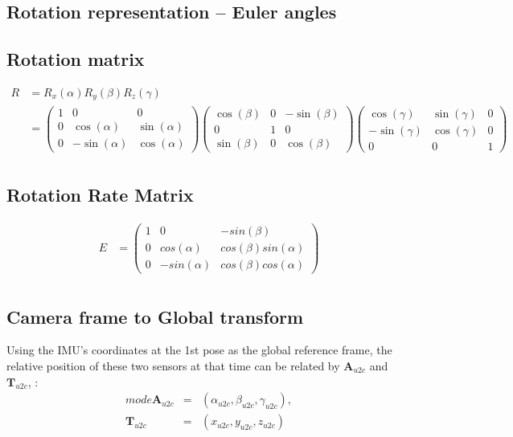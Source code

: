 \documentclass[12pt]{article}   %
\begin{document}
\newpage 
\begin{appendices}
	\section{Rotation representation -- Euler angles}
	
	\subsection{Rotation matrix}
	\begin{align*}
		R &=R_{x}(\alpha) R_{y}(\beta) R_{z}(\gamma) \nonumber \\
		  &= \begin{pmatrix} 
				1 & 0 & 0 
				\\ 0 & \cos(\alpha) & \sin(\alpha) 
				\\ 0 & -\sin(\alpha) & \cos(\alpha) 
			\end{pmatrix} 
			\begin{pmatrix} 
				\cos(\beta) & 0 & -\sin(\beta) \\ 
				0 & 1 & 0 \\ 
				\sin(\beta) &  0 & \cos(\beta) 
			\end{pmatrix} 
			\begin{pmatrix} 
				\cos(\gamma) & \sin(\gamma) & 0 
				\\ -\sin(\gamma) & \cos(\gamma) &  0 
				\\ 0 & 0 & 1 
			\end{pmatrix} \\	
		\end{align*}
		
	\subsection{Rotation Rate Matrix}
	\begin{align*}
	E &= \begin{pmatrix} 
			1 & 0 & -sin(\beta) \\ 
			0 & cos(\alpha) & cos(\beta)sin(\alpha) \\ 
			0 & -sin(\alpha) & cos(\beta)cos(\alpha) 
		 \end{pmatrix} \\
	\end{align*}
	
	\subsection{Camera frame to Global transform}	
Using the IMU's coordinates at the 1st pose as the global reference frame, the
relative position of these two sensors at that time can be related by
$\textbf{A}_{u2c}$ and $\textbf{T}_{u2c}$, : 
\begin{eqnarray*}   %
	mode \textbf{A}_{u2c} & = & (\alpha_{u2c}, \beta_{u2c}, \gamma_{u2c}), \\
	\textbf{T}_{u2c} & = & (x_{u2c}, y_{u2c}, z_{u2c})
\end{eqnarray*}


\end{appendices}
\end{document}
